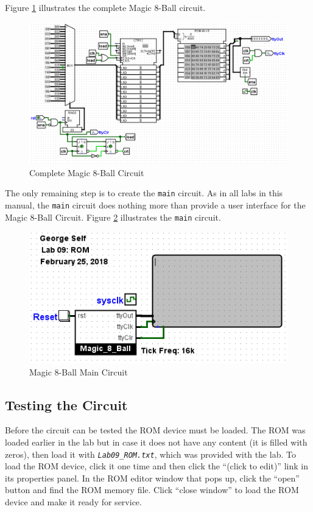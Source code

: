Figure \ref{fig:09-06} illustrates the complete Magic 8-Ball circuit.

\begin{figure}[H]
	\centering
	\includegraphics[width=\maxwidth{.95\linewidth}]{gfx/09-06}
	\caption{Complete Magic 8-Ball Circuit}
	\label{fig:09-06}
\end{figure}

The only remaining step is to create the \lstinline[columns=fixed]|main| circuit. As in all labs in this manual, the \lstinline[columns=fixed]|main| circuit does nothing more than provide a user interface for the Magic 8-Ball Circuit. Figure \ref{fig:09-07} illustrates the \lstinline[columns=fixed]|main| circuit.

\begin{figure}[H]
	\centering
	\includegraphics[width=\maxwidth{.95\linewidth}]{gfx/09-07}
	\caption{Magic 8-Ball Main Circuit}
	\label{fig:09-07}
\end{figure}

\subsection{Testing the Circuit}

Before the circuit can be tested the ROM device must be loaded. The ROM was loaded earlier in the lab but in case it does not have any content (it is filled with zeros), then load it with \emph{\texttt{Lab09\_ROM.txt}}, which was provided with the lab. To load the ROM device, click it one time and then click the ``(click to edit)'' link in its properties panel. In the ROM editor window that pops up, click the ``open'' button and find the ROM memory file. Click ``close window'' to load the ROM device and make it ready for service.

